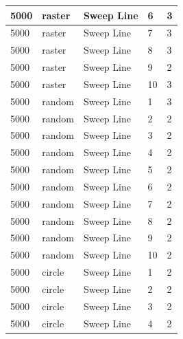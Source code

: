 \documentclass[12pt]{article}
\begin{document}
\begin{longtable}{|l|l|l|l|l|}
5000         & raster            & Sweep Line & 6          & 3                             \\ \hline
5000         & raster            & Sweep Line & 7          & 3                             \\ \hline
5000         & raster            & Sweep Line & 8          & 3                             \\ \hline
5000         & raster            & Sweep Line & 9          & 2                             \\ \hline
5000         & raster            & Sweep Line & 10         & 3                             \\ \hline
5000         & random            & Sweep Line & 1          & 3                             \\ \hline
5000         & random            & Sweep Line & 2          & 2                             \\ \hline
5000         & random            & Sweep Line & 3          & 2                             \\ \hline
5000         & random            & Sweep Line & 4          & 2                             \\ \hline
5000         & random            & Sweep Line & 5          & 2                             \\ \hline
5000         & random            & Sweep Line & 6          & 2                             \\ \hline
5000         & random            & Sweep Line & 7          & 2                             \\ \hline
5000         & random            & Sweep Line & 8          & 2                             \\ \hline
5000         & random            & Sweep Line & 9          & 2                             \\ \hline
5000         & random            & Sweep Line & 10         & 2                             \\ \hline
5000         & circle            & Sweep Line & 1          & 2                             \\ \hline
5000         & circle            & Sweep Line & 2          & 2                             \\ \hline
5000         & circle            & Sweep Line & 3          & 2                             \\ \hline
5000         & circle            & Sweep Line & 4          & 2                             \\ \hline

\end{longtable}
\end{document}

